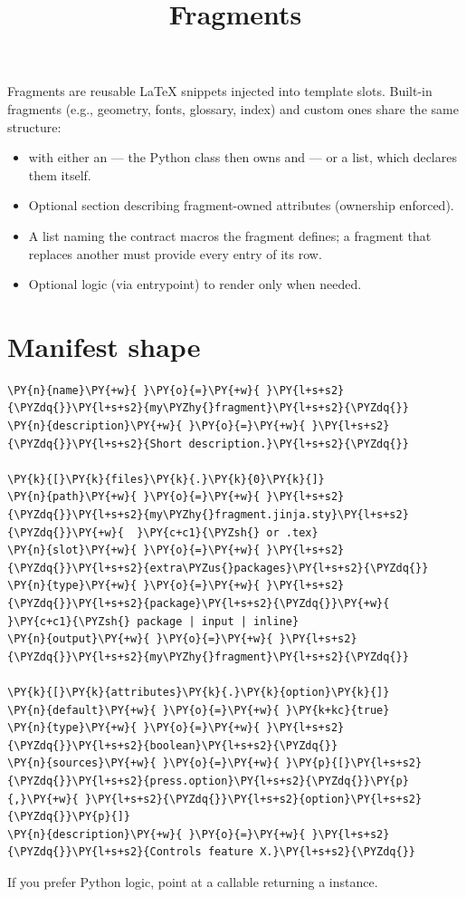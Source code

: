 \documentclass[a4paper,twoside]{article}
\title{Fragments}
\author{}\date{}
\begin{document}
\maketitle
Fragments are reusable \LaTeX{} snippets injected into template slots. Built-in fragments (e.g., geometry, fonts, glossary, index) and custom ones share the same structure:
\begin{itemize}
\item {} with either an  --- the Python class then owns 
and  --- or a  list, which declares them itself.
\item Optional  section describing fragment-owned attributes (ownership enforced).
\item A  list naming the contract macros the fragment defines; a fragment that replaces another must provide every entry of its row.
\item Optional  logic (via entrypoint) to render only when needed.
\end{itemize}
\section{Manifest shape}
\begin{tscode}[lang=toml, engine=pygments]
\begin{Verbatim}[commandchars=\\\{\},breaklines, breakanywhere, commandchars=\\\{\}]
\PY{n}{name}\PY{+w}{ }\PY{o}{=}\PY{+w}{ }\PY{l+s+s2}{\PYZdq{}}\PY{l+s+s2}{my\PYZhy{}fragment}\PY{l+s+s2}{\PYZdq{}}
\PY{n}{description}\PY{+w}{ }\PY{o}{=}\PY{+w}{ }\PY{l+s+s2}{\PYZdq{}}\PY{l+s+s2}{Short description.}\PY{l+s+s2}{\PYZdq{}}

\PY{k}{[}\PY{k}{files}\PY{k}{.}\PY{k}{0}\PY{k}{]}
\PY{n}{path}\PY{+w}{ }\PY{o}{=}\PY{+w}{ }\PY{l+s+s2}{\PYZdq{}}\PY{l+s+s2}{my\PYZhy{}fragment.jinja.sty}\PY{l+s+s2}{\PYZdq{}}\PY{+w}{  }\PY{c+c1}{\PYZsh{} or .tex}
\PY{n}{slot}\PY{+w}{ }\PY{o}{=}\PY{+w}{ }\PY{l+s+s2}{\PYZdq{}}\PY{l+s+s2}{extra\PYZus{}packages}\PY{l+s+s2}{\PYZdq{}}
\PY{n}{type}\PY{+w}{ }\PY{o}{=}\PY{+w}{ }\PY{l+s+s2}{\PYZdq{}}\PY{l+s+s2}{package}\PY{l+s+s2}{\PYZdq{}}\PY{+w}{                }\PY{c+c1}{\PYZsh{} package | input | inline}
\PY{n}{output}\PY{+w}{ }\PY{o}{=}\PY{+w}{ }\PY{l+s+s2}{\PYZdq{}}\PY{l+s+s2}{my\PYZhy{}fragment}\PY{l+s+s2}{\PYZdq{}}

\PY{k}{[}\PY{k}{attributes}\PY{k}{.}\PY{k}{option}\PY{k}{]}
\PY{n}{default}\PY{+w}{ }\PY{o}{=}\PY{+w}{ }\PY{k+kc}{true}
\PY{n}{type}\PY{+w}{ }\PY{o}{=}\PY{+w}{ }\PY{l+s+s2}{\PYZdq{}}\PY{l+s+s2}{boolean}\PY{l+s+s2}{\PYZdq{}}
\PY{n}{sources}\PY{+w}{ }\PY{o}{=}\PY{+w}{ }\PY{p}{[}\PY{l+s+s2}{\PYZdq{}}\PY{l+s+s2}{press.option}\PY{l+s+s2}{\PYZdq{}}\PY{p}{,}\PY{+w}{ }\PY{l+s+s2}{\PYZdq{}}\PY{l+s+s2}{option}\PY{l+s+s2}{\PYZdq{}}\PY{p}{]}
\PY{n}{description}\PY{+w}{ }\PY{o}{=}\PY{+w}{ }\PY{l+s+s2}{\PYZdq{}}\PY{l+s+s2}{Controls feature X.}\PY{l+s+s2}{\PYZdq{}}
\end{Verbatim}
\end{tscode}
If you prefer Python logic, point  at a callable returning a  instance.
\end{document}
